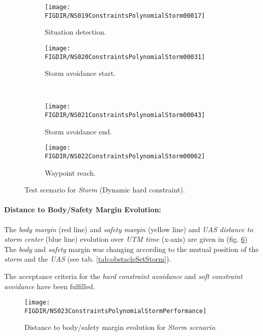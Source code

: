     \begin{figure}[H]
        \centering
        \begin{subfigure}{0.48\textwidth}
        	\centering
            \texttt{[image: \\FIGDIR/NS019ConstraintsPolynomialStorm00017]}
            \caption{Situation detection.}
            \label{fig:stromSituationDetection}
        \end{subfigure}
        \begin{subfigure}{0.48\textwidth}
        	\centering
            \texttt{[image: \\FIGDIR/NS020ConstraintsPolynomialStorm00031]} 
            \caption{Storm avoidance start.}
            \label{fig:stormAvoidanceStart}
        \end{subfigure}
        \\
        \begin{subfigure}{0.48\textwidth}
        	\centering
            \texttt{[image: \\FIGDIR/NS021ConstraintsPolynomialStorm00043]} 
            \caption{Storm avoidance end.}
            \label{fig:stormAvoidanceEnd}
        \end{subfigure}
        \begin{subfigure}{0.48\textwidth}
        	\centering
            \texttt{[image: \\FIGDIR/NS022ConstraintsPolynomialStorm00062]} 
            \caption{Waypoint reach.}
            \label{fig:stormWaypointReach}
        \end{subfigure}
        \caption{Test scenario for \emph{Storm} (Dynamic hard constraint). }
        \label{fig:testCaseStormAvoidance}
    \end{figure}
    
    \paragraph{Distance to Body/Safety Margin Evolution:} The \emph{body margin} (red line) and \emph{safety margin} (yellow line) and \emph{UAS distance to storm center} (blue line) evolution over \emph{UTM time} (x-axis) are given in (fig. \ref{fig:testCaseStormAvoidancePerformance}) The \emph{body} and \emph{safety} margin was changing according to the mutual position of the \emph{storm} and the \emph{UAS} (see tab. \ref{tab:obstacleSetStorm}). 
    
    The acceptance criteria for the \emph{hard constraint avoidance} and \emph{soft constraint avoidance} have been fulfilled. 
    
    \begin{figure}[H]
        \centering
        \texttt{[image: \\FIGDIR/NS023ConstraintsPolynomialStormPerformance]} 
        \caption{Distance to body/safety margin evolution for \emph{Storm scenario}.}
        \label{fig:testCaseStormAvoidancePerformance}
    \end{figure}
    
